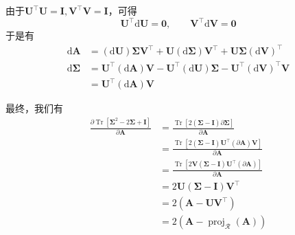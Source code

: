 \documentclass[11pt,a4paper,UTF8]{ctexart}
\begin{document}
由于$\mathbf{U}^{\top}\mathbf{U}=\mathbf{I},\mathbf{V}^{\top}\mathbf{V}=\mathbf{I}$，可得
\begin{equation*}
    \mathbf{U}^{\top}\mathrm{d} \mathbf{U}=\mathbf{0},\qquad \mathbf{V}^{\top}\mathrm{d} \mathbf{V}=\mathbf{0}
\end{equation*}
于是有
\begin{equation*}
\begin{aligned}
\mathrm{d}\mathbf{A}&= (\mathrm{d}\mathbf{U})\bm{\Sigma}\mathbf{V}^{\top}
+\mathbf{U}(\mathrm{d}\bm{\Sigma})\mathbf{V}^{\top}
+\mathbf{U}\bm{\Sigma}(\mathrm{d}\mathbf{V})^{\top}\\
\mathrm{d}\bm{\Sigma}&= \mathbf{U}^{\top}(\mathrm{d}\mathbf{A})\mathbf{V}
-\mathbf{U}^{\top}(\mathrm{d}\mathbf{U})\bm{\Sigma}
-\mathbf{U}^{\top}(\mathrm{d}\mathbf{V})^{\top}\mathbf{V}\\
&= \mathbf{U}^{\top}(\mathrm{d}\mathbf{A})\mathbf{V}
\end{aligned}
\end{equation*}

最终，我们有
\begin{equation*}
\begin{aligned}
\frac{\partial \operatorname{Tr}\left[ \bm{\Sigma}^2-2\bm{\Sigma}+\mathbf{I} \right] }{\partial \mathbf{A}}&= \frac{\operatorname{Tr}\left[ 2(\bm{\Sigma}-\mathbf{I})\partial \bm{\Sigma} \right] }{\partial \mathbf{A}}\\
&= \frac{\operatorname{Tr}\left[ 2(\bm{\Sigma}-\mathbf{I})\mathbf{U}^{\top}(\partial\mathbf{A})\mathbf{V} \right] }{\partial \mathbf{A}}\\
&= \frac{\operatorname{Tr}\left[ 2\mathbf{V}(\bm{\Sigma}-\mathbf{I})\mathbf{U}^{\top}(\partial\mathbf{A}) \right] }{\partial \mathbf{A}}\\
&= 2\mathbf{U}(\bm{\Sigma}-\mathbf{I})\mathbf{V}^{\top}\\
&= 2(\mathbf{A}-\mathbf{U}\mathbf{V}^{\top})\\
&= 2(\mathbf{A}-\operatorname{proj}_{\mathcal{R}}(\mathbf{A}))
\end{aligned}
\end{equation*}
\end{document}
